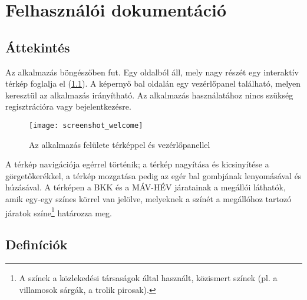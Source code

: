 \chapter{Felhasználói dokumentáció}
\label{ch:user}

\section{Áttekintés}

Az alkalmazás böngészőben fut. Egy oldalból áll, mely nagy részét egy interaktív térkép foglalja el (\ref{fig:screenshot-welcome}). A képernyő bal oldalán egy vezérlőpanel található, melyen keresztül az alkalmazás irányítható. Az alkalmazás használatához nincs szükség regisztrációra vagy bejelentkezésre.

\begin{figure}[H]
	\centering
	\texttt{[image: screenshot\_welcome]}
	\caption{Az alkalmazás felülete térképpel és vezérlőpanellel}
	\label{fig:screenshot-welcome}
\end{figure}

A térkép navigációja egérrel történik; a térkép nagyítása és kicsinyítése a görgetőkerékkel, a térkép mozgatása pedig az egér bal gombjának lenyomásával és húzásával. A térképen a BKK és a MÁV-HÉV járatainak a megállói láthatók, amik egy-egy színes körrel van jelölve, melyeknek a színét a megállóhoz tartozó járatok színe\footnote{A színek a közlekedési társaságok által használt, közismert színek (pl. a villamosok sárgák, a trolik pirosak).} határozza meg.

\section{Definíciók}

